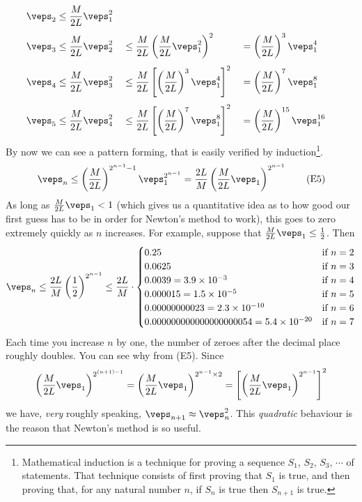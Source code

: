 \begin{alignat*}{3}
\veps_2&\le \frac{M}{2L}\veps_1^2\\[0.05in]
\veps_3&\le \frac{M}{2L}\veps_2^2 &
       &\le \frac{M}{2L}\left( \frac{M}{2L}\veps_1^2\right)^2 &
       &= \left( \frac{M}{2L}\right)^3\veps_1^4\\[0.05in]
\veps_4&\le \frac{M}{2L}\veps_3^2 &
       &\le \frac{M}{2L}\left[\left( \frac{M}{2L}\right)^3\veps_1^4\right]^2 &
       &= \left( \frac{M}{2L}\right)^7\veps_1^8\\[0.05in]
\veps_5&\le \frac{M}{2L}\veps_4^2 &
       &\le \frac{M}{2L}\left[\left( \frac{M}{2L}\right)^7\veps_1^8\right]^2 &
       &= \left( \frac{M}{2L}\right)^{15}\veps_1^{16}
\end{alignat*}
By now we can see a pattern forming, that is easily verified by 
induction\footnote{Mathematical induction is a technique for proving a
sequence $S_1$, $S_2$, $S_3$, $\cdots$ of statements. That technique consists 
of first proving that $S_1$ is true, and then proving that, for any natural 
number $n$, if $S_n$ is true then $S_{n+1}$ is true.}.
\begin{equation*}
\veps_n\le \left( \frac{M}{2L}\right)^{2^{n-1}-1}\veps_1^{2^{n-1}}
=\frac{2L}{M}\left(\frac{M}{2L}\veps_1\right)^{2^{n-1}}
\tag{E5}\end{equation*}
As long as $\frac{M}{2L}\veps_1<1$ (which gives us a quantitative idea
as to how good our first guess has to be in order for Newton's method 
to work), this goes to zero extremely quickly as $n$ increases. 
For example, suppose that $\frac{M}{2L}\veps_1\le \frac{1}{2}$. Then
\begin{equation*}
\veps_n\le \frac{2L}{M}\left(\frac{1}{2}\right)^{2^{n-1}}
\le \frac{2L}{M}\cdot\begin{cases}
                        0.25 &\mbox{if }n=2\\
                        0.0625&\mbox{if }n=3\\
                        0.0039=3.9\times 10^{-3}&\mbox{if }n=4\\
                        0.000015=1.5\times 10^{-5}&\mbox{if }n=5\\
                        0.00000000023=2.3\times 10^{-10}&\mbox{if }n=6\\
                        0.000000000000000000054=5.4\times 10^{-20}
                                   &\mbox{if }n=7
                \end{cases}
\end{equation*}
Each time you increase $n$ by one, the number of zeroes after the decimal
place roughly doubles. You can see why from (E5). Since
\begin{equation*}
\left(\frac{M}{2L}\veps_1\right)^{2^{(n+1)-1}}
=\left(\frac{M}{2L}\veps_1\right)^{2^{n-1}\times 2}
=\left[\left(\frac{M}{2L}\veps_1\right)^{2^{n-1}}\right]^2
\end{equation*}
we have, \emph{very} roughly speaking, $\veps_{n+1}\approx\veps_n^2$.
This \emph{quadratic} behaviour is the reason that Newton's method is so useful.

